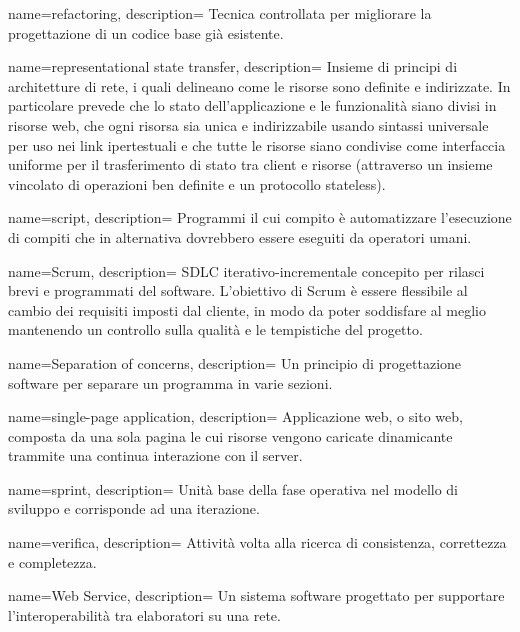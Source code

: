  {
name=refactoring,
description={
Tecnica controllata per migliorare la progettazione di un codice base già
esistente.
}
}

 {
name=representational state transfer,
description={
Insieme di principi di architetture di rete, i quali delineano come le risorse
sono definite e indirizzate. In particolare prevede che lo stato
dell’applicazione e le funzionalità siano divisi in risorse web, che ogni
risorsa sia unica e indirizzabile usando sintassi universale per uso nei link
ipertestuali e che tutte le risorse siano condivise come interfaccia uniforme
per il trasferimento di stato tra client e risorse (attraverso un insieme
vincolato di operazioni ben definite e un protocollo stateless).
}
}

 {
name=script,
description={
Programmi il cui compito è automatizzare l'esecuzione di compiti che in
alternativa dovrebbero essere eseguiti da operatori umani.
}
}

 {
name=Scrum,
description={
SDLC iterativo-incrementale concepito per rilasci brevi e programmati del
software. L'obiettivo di Scrum è essere flessibile al cambio dei requisiti
imposti dal cliente, in modo da poter soddisfare al meglio mantenendo un
controllo sulla qualità e le tempistiche del progetto.
}
}

 {
name=Separation of concerns,
description={
Un principio di progettazione software per separare un programma in varie
sezioni.
}
}

 {
name=single-page application,
description={
Applicazione web, o sito web, composta da una sola pagina le cui risorse vengono
caricate dinamicante trammite una continua interazione con il server.
}
}

 {
name=sprint,
description={
Unità base della fase operativa nel modello di sviluppo  e
corrisponde ad una iterazione.
}
}

 {
name=verifica,
description={
Attività volta alla ricerca di consistenza, correttezza e completezza.
}
}

 {
name=Web Service,
description={
Un sistema software progettato per supportare l'interoperabilità tra elaboratori
su una rete.
}
}

\makeglossaries

